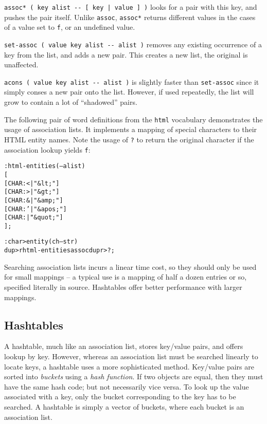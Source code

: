 \documentclass[english]{article}
\begin{document}
\texttt{assoc{*} ( key alist -{}- {[} key | value {]} )} looks for
a pair with this key, and pushes the pair itself. Unlike \texttt{assoc},
\texttt{assoc{*}} returns different values in the cases of a value
set to \texttt{f}, or an undefined value.

\texttt{set-assoc ( value key alist -{}- alist )} removes any existing
occurrence of a key from the list, and adds a new pair. This creates
a new list, the original is unaffected.

\texttt{acons ( value key alist -{}- alist )} is slightly faster
than \texttt{set-assoc} since it simply conses a new pair onto the
list. However, if used repeatedly, the list will grow to contain a
lot of {}``shadowed'' pairs.

The following pair of word definitions from the \texttt{html} vocabulary demonstrates the usage of association lists. It implements a mapping of special characters to their HTML entity names. Note the usage of \texttt{?} to return the original character if the association lookup yields \texttt{f}:

\begin{alltt}
: html-entities ( -- alist )
    {[}
        {[} CHAR: < | "\&lt;"   {]}
        {[} CHAR: > | "\&gt;"   {]}
        {[} CHAR: \& | "\&amp;"  {]}
        {[} CHAR: ' | "\&apos;" {]}
        {[} CHAR: \" | "\&quot;" {]}
    {]} ;

: char>entity ( ch -- str )
    dup >r html-entities assoc dup r> ? ;
\end{alltt}

Searching association lists incurs a linear time cost, so they should
only be used for small mappings -- a typical use is a mapping of half
a dozen entries or so, specified literally in source. Hashtables offer
better performance with larger mappings.

\subsection{Hashtables}

A hashtable, much like an association list, stores key/value pairs, and offers lookup by key. However, whereas an association list must be searched linearly to locate keys, a hashtable uses a more sophisticated method. Key/value pairs are sorted into \emph{buckets} using a \emph{hash function}. If two objects are equal, then they must have the same hash code; but not necessarily vice versa. To look up the value associated with a key, only the bucket corresponding to the key has to be searched. A hashtable is simply a vector of buckets, where each bucket is an association list.
\end{document}
